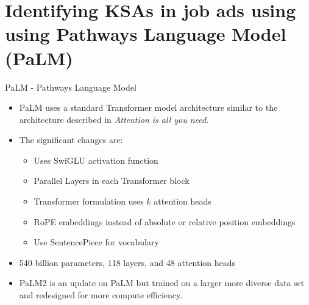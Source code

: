 \documentclass{beamer}
\begin{document}
\section{Identifying KSAs in job ads using using Pathways Language Model (PaLM)}
\begin{frame}{PaLM - Pathways Language Model\cite{palm}}
  \begin{itemize}
  \item PaLM uses a standard Transformer model architecture similar to the architecture described in \textit{Attention is all you need}. 

  \item The significant changes are:

  \begin{itemize}
    \item Uses SwiGLU activation function
    \item Parallel Layers in each Transformer block
    \item Transformer formulation uses $k$ attention heads
    \item RoPE embeddings instead of absolute or relative position embeddings 
    \item Use SentencePiece for vocabulary
  \end{itemize}

  \item 540 billion parameters, 118 layers, and 48 attention heads

  \item PaLM2 is an update on PaLM but trained on a larger more diverse data set and redesigned for more compute efficiency.\cite{palm2}

  \end{itemize}
\end{frame}

\end{document}

